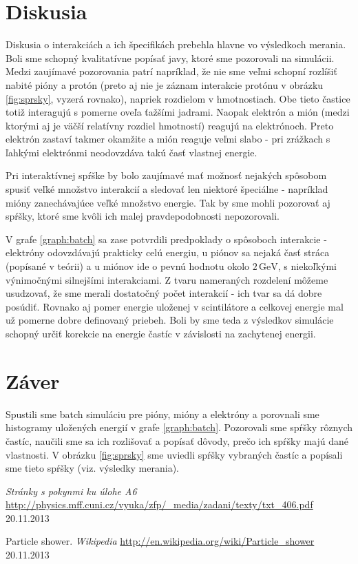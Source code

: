 \documentclass[a4paper, 10pt]{article}
\newcommand{\unit}[1]{\ensuremath{\, \mathrm{#1}}}
\begin{document}
\section*{Diskusia}
Diskusia o interakciách a ich špecifikách prebehla hlavne vo výsledkoch merania. Boli sme schopný kvalitatívne popísať javy, ktoré sme pozorovali na simulácii. Medzi zaujímavé pozorovania patrí napríklad, že nie sme veľmi schopní rozlíšiť nabité pióny a protón (preto aj nie je záznam interakcie protónu v obrázku \ref{fig:sprsky}, vyzerá rovnako), napriek rozdielom v hmotnostiach. Obe tieto častice totiž interagujú s pomerne oveľa ťažšími jadrami. Naopak elektrón a mión (medzi ktorými aj je väčší relatívny rozdiel hmotností) reagujú na elektrónoch. Preto elektrón zastaví takmer okamžite a mión reaguje veľmi slabo - pri zrážkach s ľahkými elektrónmi neodovzdáva takú časť vlastnej energie. 

Pri interaktívnej spŕške by bolo zaujímavé mať možnosť nejakých spôsobom spusiť veľké množstvo interakcií a sledovať len niektoré špeciálne - napríklad mióny zanechávajúce veľké množstvo energie. Tak by sme mohli pozorovať aj spŕšky, ktoré sme kvôli ich malej pravdepodobnosti nepozorovali.

V grafe \ref{graph:batch} sa zase potvrdili predpoklady o spôsoboch interakcie - elektróny odovzdávajú prakticky celú energiu, u piónov sa nejaká časť stráca (popísané v teórii) a u miónov ide o pevnú hodnotu okolo $2\unit{GeV}$, s niekoľkými výnimočnými silnejšími interakciami. Z tvaru nameraných rozdelení môžeme usudzovať, že sme merali dostatočný počet interakcií - ich tvar sa dá dobre posúdiť. Rovnako aj pomer energie uloženej v scintilátore a celkovej energie mal už pomerne dobre definovaný priebeh. Boli by sme teda z výsledkov simulácie schopný určiť korekcie na energie častíc v závislosti na zachytenej energii.
\section*{Záver}
Spustili sme batch simuláciu pre pióny, mióny a elektróny a porovnali sme histogramy uložených energií v grafe \ref{graph:batch}. Pozorovali sme spŕšky rôznych častíc, naučili sme sa ich rozlišovať a popísať dôvody, prečo ich spŕšky majú dané vlastnosti. V obrázku \ref{fig:sprsky} sme uviedli spŕšky vybraných častíc a popísali sme tieto spŕšky (viz. výsledky merania).

\begin{thebibliography}{9}

    \emph{Stránky s pokynmi ku úlohe A6} \\
    \url{http://physics.mff.cuni.cz/vyuka/zfp/_media/zadani/texty/txt_406.pdf} 20.11.2013

    Particle shower. \textit{Wikipedia}
    \url{http://en.wikipedia.org/wiki/Particle_shower} 20.11.2013
    
\end{thebibliography}
\end{document}
